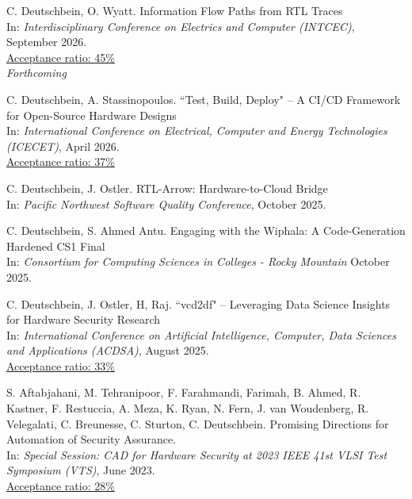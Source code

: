 \documentclass[10pt]{article}
\begin{document}
\begin{bibenum}
	\item C. Deutschbein, O. Wyatt.
		Information Flow Paths from RTL Traces \\
		In: \emph{Interdisciplinary Conference on Electrics and Computer (INTCEC)},
		September 2026. \\
		\href{https://www.intcec.org/}{Acceptance ratio: 45\%} \\
		\textit{Forthcoming}

	\item C. Deutschbein, A. Stassinopoulos.
		``Test, Build, Deploy" -- A CI/CD Framework for Open-Source Hardware Designs \\
		In: \emph{International Conference on Electrical, Computer and Energy Technologies (ICECET)},
		April 2026. \\
		\href{https://www.icecet.com/2025/prg\_p.pdf}{Acceptance ratio: 37\%} \\

	\item C. Deutschbein, J. Ostler.
		RTL-Arrow: Hardware-to-Cloud Bridge\\
		In: \emph{Pacific Northwest Software Quality Conference},
		October 2025. \\

	\item C. Deutschbein, S. Ahmed Antu.
		Engaging with the Wiphala: A Code-Generation Hardened CS1 Final\\
		In: \emph{Consortium for Computing Sciences in Colleges - Rocky Mountain}
		October 2025. \\

	\item C. Deutschbein, J. Ostler, H, Raj.
		``vcd2df" -- Leveraging Data Science Insights for Hardware Security Research\\
		In: \emph{International Conference on Artificial Intelligence, Computer, Data Sciences and Applications (ACDSA)},
		August 2025. \\
		\href{https://ieeexplore.ieee.org/stamp/stamp.jsp?arnumber=10467756}{Acceptance ratio: 33\%} \\

	\item S. Aftabjahani, M. Tehranipoor, F. Farahmandi, Farimah, B. Ahmed, R. Kastner, F. Restuccia, A. Meza, K.  Ryan, N. Fern, J. van Woudenberg, R. Velegalati, C. Breunesse, C. Sturton, C. Deutschbein.
		Promising Directions for Automation of Security Assurance.\\
		In: \emph{Special Session: CAD for Hardware Security at 2023 IEEE 41st VLSI Test Symposium (VTS)},
		June 2023. \\
		\href{https://tttc-vts.org/public_html/new/2023/technical-program/index.html}{Acceptance ratio: 28\%} \\


\end{bibenum}
\end{document}
